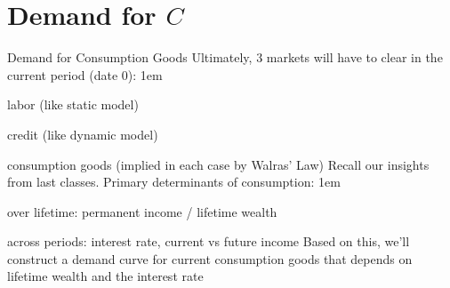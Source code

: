 \documentclass[11pt,aspectratio=43]{beamer}
\let\olditemize=\itemize
\let\endolditemize=\enditemize
\renewenvironment{itemize}{\olditemize \itemsep1em}{\endolditemize}
\let\oldenumerate=\enumerate
\let\endoldenumerate=\endenumerate
\renewenvironment{enumerate}{\oldenumerate \itemsep1em}{ \endoldenumerate}
\theoremstyle{definition}
\begin{document}
\section{Demand for $ C $}
\label{sec:Demand_for___C__}


\begin{frame}{Demand for Consumption Goods}
\label{slide:Demand_for_Consumption_Goods}
    Ultimately, 3 markets will have to clear in the current period (date 0):
    \begin{enumerate}
        \item labor (like static model)
        \item credit (like dynamic model)
        \item consumption goods (implied in each case by Walras’ Law)
    \end{enumerate}
    Recall our insights from last classes. Primary determinants of consumption:
    \begin{itemize}
        \item over lifetime: permanent income / lifetime wealth
        \item across periods: interest rate, current vs future income
    \end{itemize}
    Based on this, we’ll construct a \alert{demand curve for current consumption} goods that depends on lifetime wealth and the interest rate
\end{frame}
\end{document}
